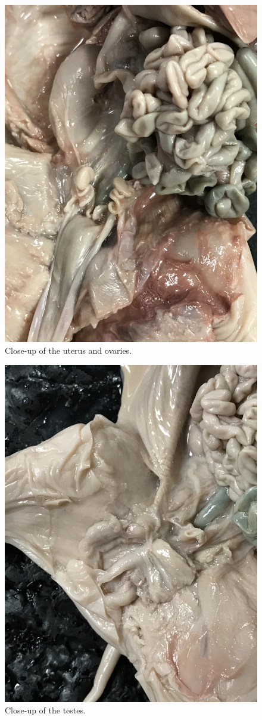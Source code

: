 \begin{figure}

{\centering \includegraphics[width=0.7\linewidth]{./figures/pig/pig_uterus}

}

\caption{Close-up of the uterus and ovaries.}\label{fig:female}
\end{figure}

\begin{figure}

{\centering \includegraphics[width=0.7\linewidth]{./figures/pig/pig_testes}

}

\caption{Close-up of the testes.}\label{fig:male}
\end{figure}

